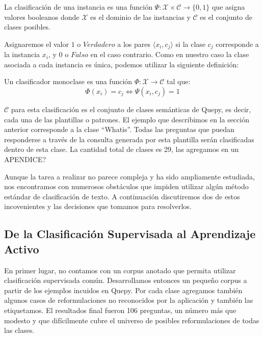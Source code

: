 \begin{definition}
La clasificación de una instancia es una función $\Psi:\mathcal{X} \times \mathcal{C} \rightarrow \{0, 1\}$ que asigna valores booleanos donde $\mathcal{X}$ es el dominio de las instancias y $\mathcal{C}$ es el conjunto de clases posibles.
\end{definition}

Asignaremos el valor $1$ o $Verdadero$ a los pares $\langle x_i, c_j \rangle$ si la clase $c_j$ corresponde a la instancia $x_i$, y $0$ o $Falso$ en el caso contrario. Como en nuestro caso la clase asociada a cada instancia es única, podemos utilizar la siguiente definición:

\begin{definition}\label{def-clasificacion}
Un clasificador monoclase es una función $\Phi:\mathcal{X} \rightarrow \mathcal{C}$ tal que:
$$ \Phi(x_i) = c_j \Leftrightarrow \Psi(x_i, c_j) = 1 $$
\end{definition}

$\mathcal{C}$ para esta clasificación es el conjunto de clases semánticas de Quepy, es decir, cada una de las plantillas o patrones. El ejemplo que describimos en la sección anterior corresponde a la clase ``Whatis''. Todas las preguntas que puedan responderse a través de la consulta generada por esta plantilla serán clasificadas dentro de esta clase. La cantidad total de clases es 29, las agregamos en un APENDICE?




Aunque la tarea a realizar no parece compleja y ha sido ampliamente estudiada, nos encontramos con numerosos obstáculos que impiden utilizar algún método estándar de clasificación de texto. A continuación discutiremos dos de estos incovenientes y las decisiones que tomamos para resolverlos.

\subsection{De la Clasificación Supervisada al Aprendizaje Activo}

En primer lugar, no contamos con un corpus anotado que permita utilizar clasificación supervisada común. Desarrollamos entonces un pequeño corpus a partir de los ejemplos incuidos en Quepy. Por cada clase agregamos también algunos casos de reformulaciones no reconocidos por la aplicación y también las etiquetamos. El resultados final fueron 106 preguntas, un número más que modesto y que difícilmente cubre el universo de posibles reformulaciones de todas las clases.

